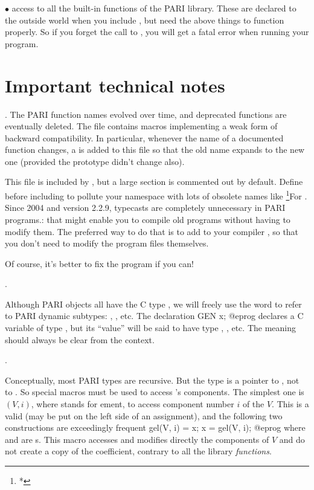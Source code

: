 $\bullet$ access to all the built-in functions of the PARI library.
These are declared to the outside world when you include , but
need the above things to function properly. So if you forget the call to
, you will get a fatal error when running your program.

\section{Important technical notes}

. The PARI function names evolved over time,
and deprecated functions are eventually deleted.  The file 
contains macros implementing a weak form of backward compatibility.
In particular, whenever the name of a documented function changes, a
 is added to this file so that the old name expands to the new
one (provided the prototype didn't change also).

This file is included by , but a large section is commented out
by default. Define  before including  to
pollute your namespace with lots of obsolete names like
\footnote{*}{For . Since 2004 and version 2.2.9,
typecasts are completely unnecessary in PARI programs.}: that might enable
you to compile old programs without having to modify them. The preferred way
to do that is to add  to your compiler ,
so that you don't need to modify the program files themselves.

Of course, it's better to fix the program if you can!

.

\noindent
Although PARI objects all have the C type , we will freely use
the word  to refer to PARI dynamic subtypes: , ,
etc. The declaration
\bprog
  GEN x;
@eprog\noindent
declares a C variable of type , but its ``value'' will be said to
have type , , etc. The meaning should always be clear from
the context.

.

\noindent
Conceptually, most PARI types are recursive. But the  type is a
pointer to , not to . So special macros must be used to
access 's components. The simplest one is $(V, i)$, where
 stands for ement, to access component number $i$ of the
 $V$. This is a valid  (may be put on the left side of
an assignment), and the following two constructions are exceedingly frequent
%
\bprog
  gel(V, i) = x;
  x = gel(V, i);
@eprog\noindent
where  and  are s. This macro accesses and modifies
directly the components of $V$ and do not create a copy of the coefficient,
contrary to all the library \emph{functions}.

